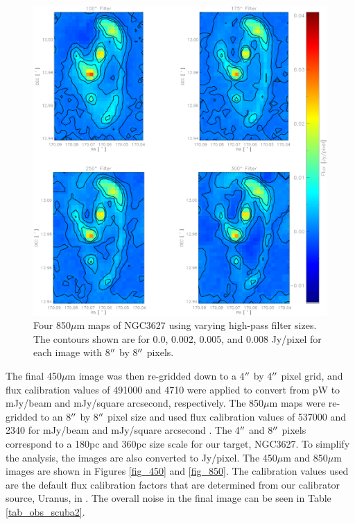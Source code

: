 \begin{figure}
  \centering
  \includegraphics[scale=0.5]{obs_imgs/850_comparison_4.eps}
  \caption[850$\mu$m High-Pass Filter Images]{Four 850$\mu$m maps of NGC3627 using varying high-pass filter sizes.  The contours shown are for 0.0, 0.002, 0.005, and 0.008 Jy/pixel for each image with 8$\mbox{$^{\prime\prime}$}$ by 8$\mbox{$^{\prime\prime}$}$ pixels.}
    \label{850_flt}
\end{figure}

The final 450$\mu$m image was then re-gridded down to a 4$\mbox{$^{\prime\prime}$}$ by 4$\mbox{$^{\prime\prime}$}$ pixel grid, and flux calibration values of 491000 and 4710 \citep{dempsey2013} were applied to convert from pW to mJy/beam and mJy/square arcsecond, respectively.  The 850$\mu$m maps were re-gridded to an 8$\mbox{$^{\prime\prime}$}$ by 8$\mbox{$^{\prime\prime}$}$ pixel size and used flux calibration values of 537000 and 2340 for mJy/beam and mJy/square arcsecond \citep{dempsey2013}.  The 4$\mbox{$^{\prime\prime}$}$ and 8$\mbox{$^{\prime\prime}$}$ pixels correspond to a 180pc and 360pc size scale for our target, NGC3627.  To simplify the analysis, the images are also converted to Jy/pixel.  The 450$\mu$m and 850$\mu$m images are shown in Figures \ref{fig_450} and \ref{fig_850}.  The calibration values used are the default flux calibration factors that are determined from our calibrator source, Uranus, in  \citep{dempsey2013}.  The overall noise in the final image can be seen in Table \ref{tab_obs_scuba2}.

